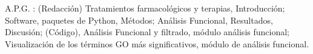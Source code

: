 \documentclass{bmcart}
\begin{document}
\begin{backmatter}
			A.P.G. : (Redacción) Tratamientos farmacológicos y terapias, Introducción; Software, paquetes de Python, Métodos; Análisis Funcional, Resultados, Discusión; (Código), Análisis Funcional y filtrado, módulo análisis funcional; Visualización de los términos GO más significativos, módulo de análisis funcional.
	
	
		
	
	\end{backmatter}
\end{document}
